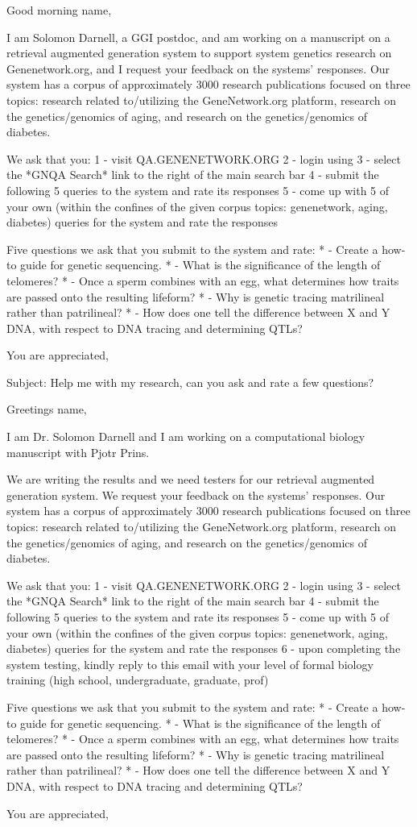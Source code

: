 Good morning name​,

I am Solomon Darnell, a GGI postdoc, and am working on a manuscript on a retrieval augmented generation system to support system genetics research on Genenetwork.org, and I request your feedback on the systems' responses. 
Our system has a corpus of approximately 3000 research publications focused on three topics: research related to/utilizing the GeneNetwork.org platform, research on the genetics/genomics of aging, and research on the genetics/genomics of diabetes.

We ask that you:
1 - visit QA.GENENETWORK.ORG
2 - login using 
3 - select the *GNQA Search* link to the right of the main search bar
4 - submit the following 5 queries to the system and rate its responses
5 - come up with 5 of your own (within the confines of the given corpus topics: genenetwork, aging, diabetes) queries for the system and rate the responses

Five questions we ask that you submit to the system and rate:
* - Create a how-to guide for genetic sequencing.
* - What is the significance of the length of telomeres?
* - Once a sperm combines with an egg, what determines how traits are passed onto the resulting lifeform?
* - Why is genetic tracing matrilineal rather than patrilineal?
* - How does one tell the difference between X and Y DNA, with respect to DNA tracing and determining QTLs?

You are appreciated,


Subject: Help me with my research, can you ask and rate a few questions?

Greetings name​,

I am Dr. Solomon Darnell and I am working on a computational biology manuscript with Pjotr Prins.

We are writing the results and we need testers for our retrieval augmented generation system.
We request your feedback on the systems' responses. 
Our system has a corpus of approximately 3000 research publications focused on three topics: research related to/utilizing the GeneNetwork.org platform, research on the genetics/genomics of aging, and research on the genetics/genomics of diabetes.

We ask that you:
1 - visit QA.GENENETWORK.ORG
2 - login using 
3 - select the *GNQA Search* link to the right of the main search bar
4 - submit the following 5 queries to the system and rate its responses
5 - come up with 5 of your own (within the confines of the given corpus topics: genenetwork, aging, diabetes) queries for the system and rate the responses
6 - upon completing the system testing, kindly reply to this email with your level of formal biology training (high school, undergraduate, graduate, prof)

Five questions we ask that you submit to the system and rate:
* - Create a how-to guide for genetic sequencing.
* - What is the significance of the length of telomeres?
* - Once a sperm combines with an egg, what determines how traits are passed onto the resulting lifeform?
* - Why is genetic tracing matrilineal rather than patrilineal?
* - How does one tell the difference between X and Y DNA, with respect to DNA tracing and determining QTLs?

You are appreciated,